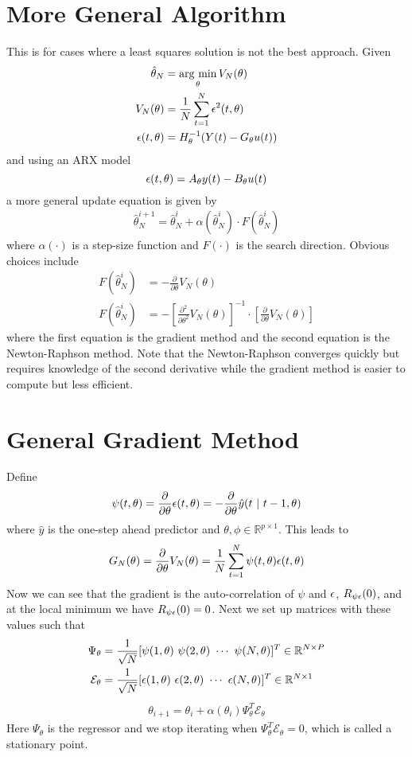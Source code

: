 \section{More General Algorithm}
This is for cases where a least squares solution is not the best approach. Given
\begin{align*}
\hat{\theta}_N &= \mathop{\arg\,\min}\limits_\theta V_N(\theta) \\
V_N(\theta) &= \frac{1}{N}\sum_{t=1}^N\epsilon^2(t,\theta) \\
\epsilon(t,\theta) &= H_\theta^{-1}(Y(t)-G_\theta u(t))
\end{align*}
and using an ARX model
$$\epsilon(t,\theta) = A_\theta y(t)-B_\theta u(t)$$
a more general update equation is given by
\begin{align*}
\boxed{\hat{\theta}_N^{i+1} = \hat{\theta}_N^i + \alpha(\hat{\theta}_N^i)\cdot F(\hat{\theta}_N^i)}
\end{align*}
where $\alpha(\cdot)$ is a step-size function and $F(\cdot)$ is the search direction. Obvious choices include
\begin{align*}
F(\hat{\theta}_N^i) &= -\frac{\partial}{\partial\theta}V_N(\theta) \\
F(\hat{\theta}_N^i) &= -\left[\frac{\partial^2}{\partial\theta^2}V_N(\theta)\right]^{-1}\cdot\left[\frac{\partial}{\partial\theta}V_N(\theta)\right]
\end{align*}
where the first equation is the gradient method and the second equation is the Newton-Raphson method. Note that the Newton-Raphson converges quickly but requires knowledge of the second derivative while the gradient method is easier to compute but less efficient.

\section{General Gradient Method}
Define
$$\psi(t,\theta) = \frac{\partial}{\partial\theta}\epsilon(t,\theta) = -\frac{\partial}{\partial\theta}\hat{y}(t~|~t-1,\theta)$$
where $\hat{y}$ is the one-step ahead predictor and $\theta,\phi\in\mathbb{R}^{p\times1}$. This leads to
$$G_N(\theta) = \frac{\partial}{\partial\theta}V_N(\theta) = \frac{1}{N}\sum_{t=1}^N\psi(t,\theta)\epsilon(t,\theta)$$
Now we can see that the gradient is the auto-correlation of $\psi$ and $\epsilon$, $R_{\psi\epsilon}(0)$, and at the local minimum we have $R_{\psi\epsilon}(0)=0$. Next we set up matrices with these values such that
\begin{align*}
\Psi_\theta &= \frac{1}{\sqrt{N}} [\psi(1,\theta) ~ \psi(2,\theta) ~ \cdots ~ \psi(N,\theta)]^T\in\mathbb{R}^{N\times P} \\
\mathcal{E}_\theta &= \frac{1}{\sqrt{N}} [\epsilon(1,\theta) ~ \epsilon(2,\theta) ~ \cdots ~ \epsilon(N,\theta)]^T\in\mathbb{R}^{N\times1}
\end{align*}
\begin{align*}
\boxed{\theta_{i+1} = \theta_i + \alpha(\theta_i)\Psi_\theta^T\mathcal{E}_\theta}
\end{align*}
Here $\Psi_\theta$ is the regressor and we stop iterating when $\Psi_\theta^T\mathcal{E}_\theta=0$, which is called a stationary point.

